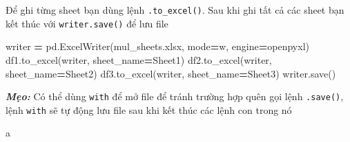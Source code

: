 \documentclass[
]{book}
\makeatletter
\newenvironment{Shaded}{\begin{snugshade}}{\end{snugshade}}
\newcommand{\NormalTok}[1]{#1}
\newcommand{\OperatorTok}[1]{\textcolor[rgb]{0.81,0.36,0.00}{\textbf{#1}}}
\newcommand{\StringTok}[1]{\textcolor[rgb]{0.31,0.60,0.02}{#1}}
\newenvironment{kframe}{%
\medskip{}
\setlength{\fboxsep}{.8em}
 \def\at@end@of@kframe{}%
 \ifinner\ifhmode%
  \def\at@end@of@kframe{\end{minipage}}%
  \begin{minipage}{\columnwidth}%
 \fi\fi%
 \def\FrameCommand##1{\hskip\@totalleftmargin \hskip-\fboxsep
 \colorbox{shadecolor}{##1}\hskip-\fboxsep
     \hskip-\linewidth \hskip-\@totalleftmargin \hskip\columnwidth}%
 \MakeFramed {\advance\hsize-\width
   \@totalleftmargin\z@ \linewidth\hsize
   \@setminipage}}%
 {\par\unskip\endMakeFramed%
 \at@end@of@kframe}
\newenvironment{rmdblock}[1]
  {
  \begin{itemize}
  \renewcommand{\labelitemi}{
    \raisebox{-.7\height}[0pt][0pt]{
      {\setkeys{Gin}{width=3em,keepaspectratio}\texttt{[image: images/\#1]}}
    }
  }
  \setlength{\fboxsep}{1em}
  \begin{kframe}
  \item
  }
  {
  \end{kframe}
  \end{itemize}
  }
\newenvironment{rmdtip}
  {\begin{rmdblock}{tip}}
  {\end{rmdblock}}
\makeatother
\begin{document}
Để ghi từng sheet bạn dùng lệnh \texttt{.to\_excel()}. Sau khi ghi tất cả các sheet bạn kết thúc với \texttt{writer.save()} để lưu file

\begin{Shaded}
\begin{Highlighting}[]
\NormalTok{writer }\OperatorTok{=}\NormalTok{ pd.ExcelWriter(}\StringTok{\textquotesingle{}mul\_sheets.xlsx\textquotesingle{}}\NormalTok{, mode}\OperatorTok{=}\StringTok{\textquotesingle{}w\textquotesingle{}}\NormalTok{, engine}\OperatorTok{=}\StringTok{\textquotesingle{}openpyxl\textquotesingle{}}\NormalTok{)}
\NormalTok{df1.to\_excel(writer, sheet\_name}\OperatorTok{=}\StringTok{\textquotesingle{}Sheet1\textquotesingle{}}\NormalTok{)}
\NormalTok{df2.to\_excel(writer, sheet\_name}\OperatorTok{=}\StringTok{\textquotesingle{}Sheet2\textquotesingle{}}\NormalTok{)}
\NormalTok{df3.to\_excel(writer, sheet\_name}\OperatorTok{=}\StringTok{\textquotesingle{}Sheet3\textquotesingle{}}\NormalTok{)}
\NormalTok{writer.save()}
\end{Highlighting}
\end{Shaded}

\begin{rmdtip}
\textbf{\emph{Mẹo:}}
Có thể dùng \texttt{with} để mở file để tránh trường hợp quên gọi lệnh \texttt{.save()}, lệnh \texttt{with} sẽ tự động lưu file sau khi kết thúc các lệnh con trong nó
\end{rmdtip}
a
\end{document}
